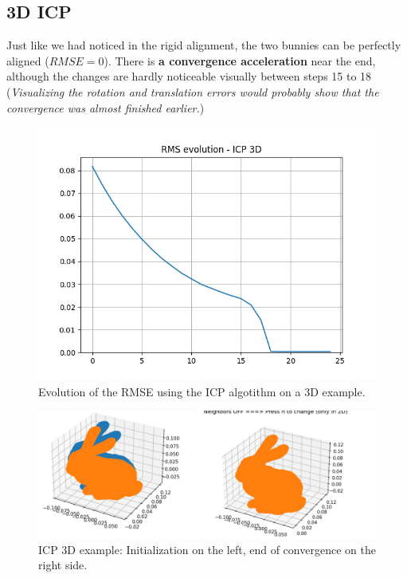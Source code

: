 \documentclass[a4paper]{article}
\begin{document}
\subsection*{3D ICP}
Just like we had noticed in the rigid alignment, the two bunnies can be perfectly aligned ($RMSE=0$). There is \textbf{a convergence acceleration} near the end, although the changes are hardly noticeable visually between steps 15 to 18 (\textit{Visualizing the rotation and translation errors would probably show that the convergence was almost finished earlier.})
\begin{figure}[ht]
  \centering
  \includegraphics[width=0.8\linewidth]{figures/icp3d_rms.png}
  \caption{Evolution of the RMSE using the ICP algotithm on a 3D example.}
  \label{fig:icp_3D}
\end{figure}

\begin{figure}[ht]
  \centering
  \includegraphics[width=0.8\linewidth]{figures/icp3d_convergence.png}
  \caption{ICP 3D example: Initialization on the left, end of convergence on the right side.}
  \label{fig:icp_3D}
\end{figure}





\pagebreak
\end{document}
